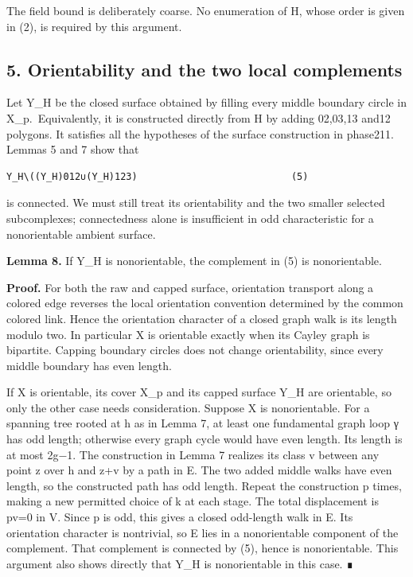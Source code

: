 \documentclass[
  11pt,
  a4paper,
]{article}
\begin{document}
The field bound is deliberately coarse. No enumeration of H, whose order
is given in (2), is required by this argument.

\subsection{5. Orientability and the two local
complements}\label{orientability-and-the-two-local-complements}

Let Y\_H be the closed surface obtained by filling every middle boundary
circle in X\_p.~Equivalently, it is constructed directly from H by
adding 02,03,13 and12 polygons. It satisfies all the hypotheses of the
surface construction in phase211. Lemmas 5 and 7 show that

\begin{verbatim}
Y_H\((Y_H)012∪(Y_H)123)                           (5)
\end{verbatim}

is connected. We must still treat its orientability and the two smaller
selected subcomplexes; connectedness alone is insufficient in odd
characteristic for a nonorientable ambient surface.

\textbf{Lemma 8.} If Y\_H is nonorientable, the complement in (5) is
nonorientable.

\textbf{Proof.} For both the raw and capped surface, orientation
transport along a colored edge reverses the local orientation convention
determined by the common colored link. Hence the orientation character
of a closed graph walk is its length modulo two. In particular X is
orientable exactly when its Cayley graph is bipartite. Capping boundary
circles does not change orientability, since every middle boundary has
even length.

If X is orientable, its cover X\_p and its capped surface Y\_H are
orientable, so only the other case needs consideration. Suppose X is
nonorientable. For a spanning tree rooted at h as in Lemma 7, at least
one fundamental graph loop γ has odd length; otherwise every graph cycle
would have even length. Its length is at most 2g−1. The construction in
Lemma 7 realizes its class v between any point z over h and z+v by a
path in E. The two added middle walks have even length, so the
constructed path has odd length. Repeat the construction p times, making
a new permitted choice of k at each stage. The total displacement is
pv=0 in V. Since p is odd, this gives a closed odd-length walk in E. Its
orientation character is nontrivial, so E lies in a nonorientable
component of the complement. That complement is connected by (5), hence
is nonorientable. This argument also shows directly that Y\_H is
nonorientable in this case. ∎
\end{document}
